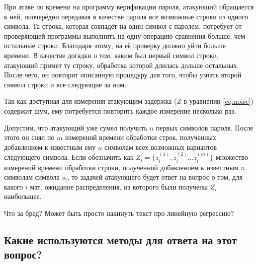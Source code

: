При атаке по времени на программу верификации пароля, атакующий обращается к ней,
поочерёдно передавая в качестве пароля все возможные строки из одного символа.
Та строка, которая совпадёт на один символ с паролем, потребует от проверяющей программы
выполнить на одну операцию сравнения больше, чем остальные строки. Благодаря
этому, на её проверку должно уйти больше времени. В качестве догадки о том,
каким был первый символ строки, атакующий примет ту строку, обработка которой
длилась дольше остальных. После чего, он повторит описанную процедуру для того,
чтобы узнать второй символ строки и все следующие за ним.

Так как доступная для измерения атакующим задержка ($Z$ в уравнении \ref{eq:noise})
содержит шум, ему потребуется повторить каждое измерение несколько раз.

Допустим, что атакующий уже сумел получить $n$ первых символов пароля. После
этого он снял по $m$ измерений времени обработки строк, полученных добавлением
к известным ему $n$ символам всех возможных вариантов следующего символа.
Если обозначить как $Z_i = \{ z_i^{(1)}, z_i^{(2)} ... z_i^{(m)}  \}$ множество
измерений времени обработки строки, полученной добавлением к известным $n$
символам символа $s_i$, то задачей атакующего будет ответ на вопрос о том,
для какого $i$ мат. ожидание распределения, из которого были получены $Z_i$
наибольшее.

Что за бред? Может быть просто накинуть текст про линейную регрессию?

\subsection{Какие используются методы для ответа на этот вопрос?}

\clearpage
